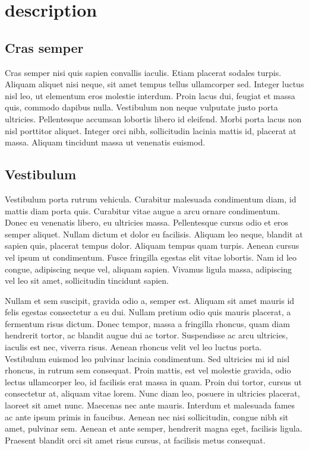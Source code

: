\documentclass[11pt,a4paper,english]{report}
\begin{document}
\chapter{description}

\section{Cras semper}
\par Cras semper nisi quis sapien convallis iaculis. Etiam placerat sodales turpis. Aliquam aliquet nisi neque, sit amet tempus tellus ullamcorper sed. Integer luctus nisl leo, ut elementum eros molestie interdum. Proin lacus dui, feugiat et massa quis, commodo dapibus nulla. Vestibulum non neque vulputate justo porta ultricies. Pellentesque accumsan lobortis libero id eleifend. Morbi porta lacus non nisl porttitor aliquet. Integer orci nibh, sollicitudin lacinia mattis id, placerat at massa. Aliquam tincidunt massa ut venenatis euismod.

\section{Vestibulum}
\par Vestibulum porta rutrum vehicula. Curabitur malesuada condimentum diam, id mattis diam porta quis. Curabitur vitae augue a arcu ornare condimentum. Donec eu venenatis libero, eu ultricies massa. Pellentesque cursus odio et eros semper aliquet. Nullam dictum et dolor eu facilisis. Aliquam leo neque, blandit at sapien quis, placerat tempus dolor. Aliquam tempus quam turpis. Aenean cursus vel ipsum ut condimentum. Fusce fringilla egestas elit vitae lobortis. Nam id leo congue, adipiscing neque vel, aliquam sapien. Vivamus ligula massa, adipiscing vel leo sit amet, sollicitudin tincidunt sapien.

\par Nullam et sem suscipit, gravida odio a, semper est. Aliquam sit amet mauris id felis egestas consectetur a eu dui. Nullam pretium odio quis mauris placerat, a fermentum risus dictum. Donec tempor, massa a fringilla rhoncus, quam diam hendrerit tortor, ac blandit augue dui ac tortor. Suspendisse ac arcu ultricies, iaculis est nec, viverra risus. Aenean rhoncus velit vel leo luctus porta. Vestibulum euismod leo pulvinar lacinia condimentum. Sed ultricies mi id nisl rhoncus, in rutrum sem consequat. Proin mattis, est vel molestie gravida, odio lectus ullamcorper leo, id facilisis erat massa in quam. Proin dui tortor, cursus ut consectetur at, aliquam vitae lorem. Nunc diam leo, posuere in ultricies placerat, laoreet sit amet nunc. Maecenas nec ante mauris. Interdum et malesuada fames ac ante ipsum primis in faucibus. Aenean nec nisi sollicitudin, congue nibh sit amet, pulvinar sem. Aenean et ante semper, hendrerit magna eget, facilisis ligula. Praesent blandit orci sit amet risus cursus, at facilisis metus consequat.
\end{document}
